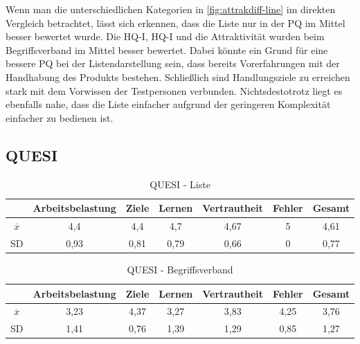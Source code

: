 Wenn man die unterschiedlichen Kategorien in \autoref{fig:attrakdiff-line} im direkten Vergleich betrachtet, lässt sich erkennen, dass die Liste nur in der \ac{PQ} im Mittel besser bewertet wurde.
Die \ac{HQ-I}, \ac{HQ-I} und die Attraktivität wurden beim Begriffsverband im Mittel besser bewertet.
Dabei könnte ein Grund für eine bessere \ac{PQ} bei der Listendarstellung sein, dass bereits Vorerfahrungen mit der Handhabung des Produkts bestehen.
Schließlich sind Handlungsziele zu erreichen stark mit dem Vorwissen der Testpersonen verbunden.
Nichtsdestotrotz liegt es ebenfalls nahe, dass die Liste einfacher aufgrund der geringeren Komplexität einfacher zu bedienen ist.\\

\subsection{QUESI}
\begin{center}
    \begin{table}[!ht]
        \centering
        \begin{tabular}{|l|c|c|c|c|c|c|}
            \hline
                                                 & Arbeitsbelastung & Ziele & Lernen & Vertrautheit & Fehler & Gesamt \\ \hline \hline
            \multicolumn{1}{|c|}{$\overline{x}$} & 4,4              & 4,4   & 4,7    & 4,67         & 5      & 4,61   \\ \hline
            \multicolumn{1}{|c|}{SD}             & 0,93             & 0,81  & 0,79   & 0,66         & 0      & 0,77   \\ \hline
        \end{tabular}
        \caption{QUESI - Liste}
        \label{table:quesi-list}
    \end{table}
\end{center}

\begin{center}
    \begin{table}[!ht]
        \centering
        \begin{tabular}{|l|c|c|c|c|c|c|}
            \hline
                                                 & Arbeitsbelastung & Ziele & Lernen & Vertrautheit & Fehler & Gesamt \\ \hline \hline
            \multicolumn{1}{|c|}{$\overline{x}$} & 3,23             & 4,37  & 3,27   & 3,83         & 4,25   & 3,76   \\ \hline
            \multicolumn{1}{|c|}{SD}             & 1,41             & 0,76  & 1,39   & 1,29         & 0,85   & 1,27   \\ \hline
        \end{tabular}
        \caption{QUESI - Begriffsverband}
        \label{table:quesi-fca}
    \end{table}
\end{center}


